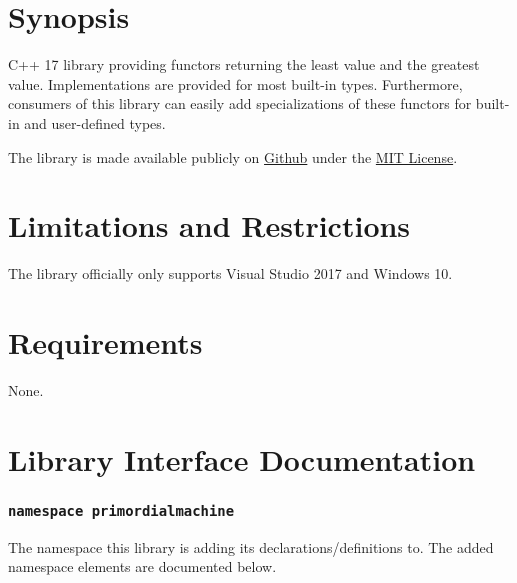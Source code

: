 \documentclass[oneside]{book}
\begin{document}
\frontmatter

\begin{titlepage}
\maketitle
\end{titlepage}

\tableofcontents
{}

\mainmatter

\chapter{Synopsis}
C++ 17 library providing functors returning the least value and the greatest value.\newline
\noindent{}Implementations are provided for most built-in types.\newline
\noindent{}Furthermore, consumers of this library can easily add specializations of these functors for built-in and user-defined types.\newline

The library is made available publicly on
\href{\GetLibraryRepository}{Github}
under the
\href{\GetLibraryRepository/blob/master/LICENSE}{MIT License}.

\chapter{Limitations and Restrictions}
The library officially only supports Visual Studio 2017 and Windows 10.

\chapter{Requirements}
None.





\chapter{Library Interface Documentation}

\subsection{\texttt{namespace primordialmachine}}
The namespace this library is adding its declarations/definitions to.
The added namespace elements are documented below.





\end{document}

